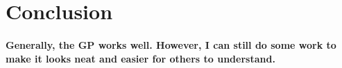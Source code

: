 \documentclass[12pt]{article}
\begin{document}
\section{Conclusion}
\paragraph{Generally, the GP works well. However, I can still do some work to make it looks neat and easier for others to understand.}
\end{document}
